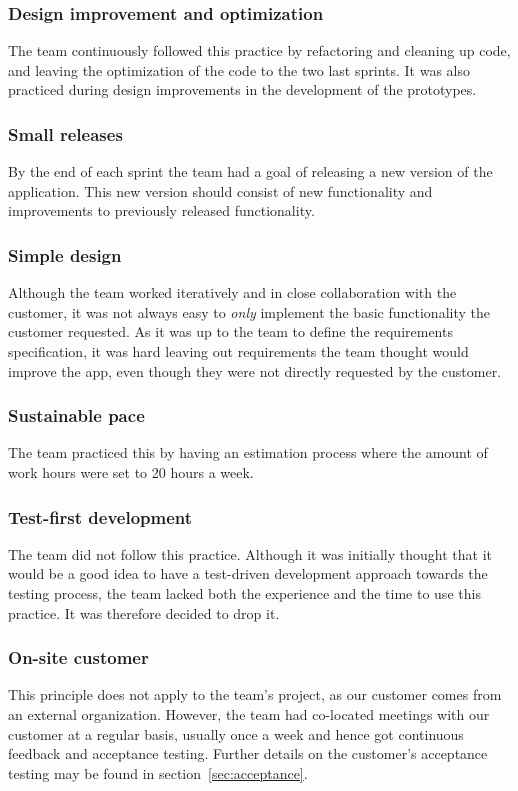 \subsubsection{Design improvement and optimization}
The team continuously followed this practice by refactoring and cleaning up code, and leaving the optimization of the code to the two last sprints. It was also practiced during design improvements in the development of the prototypes.
 
\subsubsection{Small releases}
By the end of each sprint the team had a goal of releasing a new version of the application. This new version should consist of new functionality and improvements to previously released functionality.

\subsubsection{Simple design}
Although the team worked iteratively and in close collaboration with the customer, it was not always easy to \emph{only} implement the basic functionality the customer requested. As it was up to the team to define the requirements specification, it was hard leaving out requirements the team thought would improve the app, even though they were not directly requested by the customer.

\subsubsection{Sustainable pace}
The team practiced this by having an estimation process where the amount of work hours were set to 20 hours a week.

\subsubsection{Test-first development}
The team did not follow this practice. Although it was initially thought that it would be a good idea to have a test-driven development approach towards the testing process, the team lacked both the experience and the time to use this practice. It was therefore decided to drop it.

\subsubsection{On-site customer}
This principle does not apply to the team's project, as our customer comes from an external organization. However, the team had co-located meetings with our customer at a regular basis, usually once a week and hence got continuous feedback and acceptance testing. Further details on the customer's acceptance testing may be found in section~\ref{sec:acceptance}.
